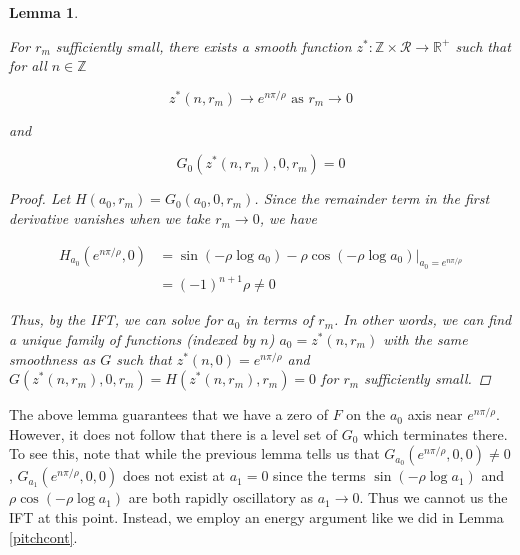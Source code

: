 \documentclass[12pt]{article}
\def\R{{\mathbb R}}
\def\Z{{\mathbb Z}}
\newtheorem{lemma}{Lemma}
\begin{document}

\begin{lemma}\label{axiszero}

For $r_m$ sufficiently small, there exists a smooth function $z^*: \Z \times \mathcal{R} \rightarrow \R^+$ such that for all $n \in \Z$

\begin{equation}
z^*(n, r_m) \rightarrow e^{n \pi/\rho} \text{ as } r_m \rightarrow 0
\end{equation}

and 

\begin{equation}
G_0(z^*(n, r_m), 0, r_m) = 0
\end{equation}

\begin{proof}
Let $H(a_0, r_m) = G_0(a_0, 0, r_m)$. Since the remainder term in the first derivative vanishes when we take $r_m \rightarrow 0$, we have

\begin{align*}
H_{a_0}(e^{n \pi / \rho}, 0) &=
\sin \left( - \rho \log a_0 \right) - \rho \cos \left( - \rho \log a_0 \right) \Big|_{a_0 = e^{n \pi / \rho}} \\
&= (-1)^{n+1} \rho \neq 0
\end{align*}

Thus, by the IFT, we can solve for $a_0$ in terms of $r_m$. In other words, we can find a unique family of functions (indexed by $n$) $a_0 = z^*(n, r_m)$ with the same smoothness as $G$ such that $z^*(n, 0) = e^{n \pi/\rho}$ and $G(z^*(n, r_m),0, r_m) = H(z^*(n, r_m), r_m) = 0$ for $r_m$ sufficiently small.

\end{proof}
\end{lemma}

The above lemma guarantees that we have a zero of $F$ on the $a_0$ axis near $e^{n \pi/\rho}$. However, it does not follow that there is a level set of $G_0$ which terminates there. To see this, note that while the previous lemma tells us that $G_{a_0}(e^{n \pi/\rho}, 0, 0) \neq 0$, $G_{a_1}(e^{n \pi/\rho}, 0, 0)$ does not exist at $a_1 = 0$ since the terms $\sin(-\rho \log a_1)$ and $\rho \cos(-\rho \log a_1)$ are both rapidly oscillatory as $a_1 \rightarrow 0$. Thus we cannot us the IFT at this point. Instead, we employ an energy argument like we did in Lemma \ref{pitchcont}.

\end{document}
